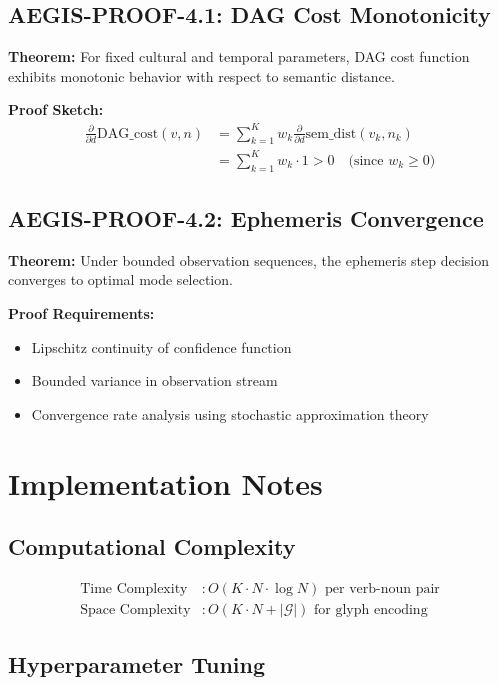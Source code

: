 \documentclass[11pt]{article}
\begin{document}
\subsection{AEGIS-PROOF-4.1: DAG Cost Monotonicity}

\textbf{Theorem:} For fixed cultural and temporal parameters, DAG cost function exhibits monotonic behavior with respect to semantic distance.

\textbf{Proof Sketch:} 
\begin{align}
\frac{\partial}{\partial d} \text{DAG\_cost}(v,n) &= \sum_{k=1}^{K} w_k \frac{\partial}{\partial d} \text{sem\_dist}(v_k, n_k) \\
&= \sum_{k=1}^{K} w_k \cdot 1 > 0 \quad \text{(since } w_k \geq 0\text{)}
\end{align}

\subsection{AEGIS-PROOF-4.2: Ephemeris Convergence}

\textbf{Theorem:} Under bounded observation sequences, the ephemeris step decision converges to optimal mode selection.

\textbf{Proof Requirements:}
\begin{itemize}
\item Lipschitz continuity of confidence function
\item Bounded variance in observation stream
\item Convergence rate analysis using stochastic approximation theory
\end{itemize}

\section{Implementation Notes}

\subsection{Computational Complexity}

\begin{align}
\text{Time Complexity} &: O(K \cdot N \cdot \log N) \text{ per verb-noun pair} \\
\text{Space Complexity} &: O(K \cdot N + |\mathcal{G}|) \text{ for glyph encoding}
\end{align}

\subsection{Hyperparameter Tuning}
\end{document}
